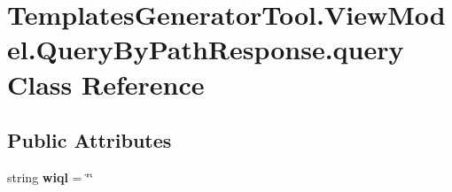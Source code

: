 \hypertarget{class_templates_generator_tool_1_1_view_model_1_1_query_by_path_response_1_1query}{}\section{Templates\+Generator\+Tool.\+View\+Model.\+Query\+By\+Path\+Response.\+query Class Reference}
\label{class_templates_generator_tool_1_1_view_model_1_1_query_by_path_response_1_1query}
\subsection*{Public Attributes}
\begin{DoxyCompactItemize}
\item 
\mbox{\label{class_templates_generator_tool_1_1_view_model_1_1_query_by_path_response_1_1query_aae84b75edb93cef4298327e82018d410}} 
string {\bfseries wiql} = \char`\"{}\char`\"{}
\end{DoxyCompactItemize}

